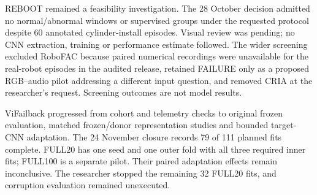 REBOOT \parencite{OforiAmpofo2026REBOOT} remained a feasibility investigation. The
28 October decision admitted no
normal/abnormal windows or supervised groups under the requested protocol despite 60
annotated cylinder-install episodes. Visual review was pending; no CNN extraction,
training or performance estimate followed. The wider screening excluded RoboFAC
\parencite{Lu2025RoboFAC,RoboFACHF2025} because paired numerical recordings were
unavailable for the real-robot episodes in the audited release, retained FAILURE
\parencite{Inceoglu2021FINONet} only as a proposed RGB--audio pilot addressing a different
input question, and removed CRIA \parencite{Qiao2026MAIA} at the researcher's request.
Screening outcomes are not model results.

ViFailback progressed from cohort and telemetry checks to original frozen evaluation,
matched frozen/donor representation studies and bounded target-CNN adaptation. The 24
November closure records 79 of 111 planned fits complete. FULL20 has one seed and one
outer fold with all three required inner fits; FULL100 is a separate pilot. Their paired
adaptation effects remain inconclusive. The researcher stopped the remaining 32 FULL20
fits, and corruption evaluation remained unexecuted.

